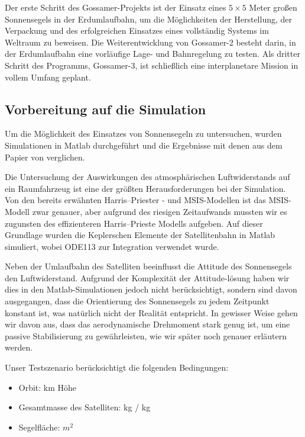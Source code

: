 Der erste Schritt des Gossamer-Projekts ist der Einsatz eines $5\times5$ Meter großen Sonnensegels in der Erdumlaufbahn, um die Möglichkeiten der Herstellung, der Verpackung und des erfolgreichen Einsatzes eines vollständig Systems im Weltraum zu beweisen. Die Weiterentwicklung von Gossamer-2 besteht darin, in der Erdumlaufbahn eine vorläufige Lage- und Bahnregelung zu testen. Als dritter Schritt des Programms, Gossamer-3, ist schließlich eine interplanetare Mission in vollem Umfang geplant. 

\subsection{Vorbereitung auf die Simulation}
Um die Möglichkeit des Einsatzes von Sonnensegeln zu untersuchen, wurden Simulationen in Matlab durchgeführt und die Ergebnisse mit denen aus dem Papier von \citet{Daniele:2012} verglichen. 

Die Untersuchung der Auswirkungen des atmosphärischen Luftwiderstands auf ein Raumfahrzeug ist eine der größten Herausforderungen bei der Simulation. Von den bereits erwähnten Harris–Priester - und MSIS-Modellen ist das MSIS-Modell zwar genauer, aber aufgrund des riesigen Zeitaufwands mussten wir es zugunsten des effizienteren Harris–Prieste Modells aufgeben. Auf dieser Grundlage wurden die Keplerschen Elemente der Satellitenbahn in Matlab simuliert, wobei ODE113 zur Integration verwendet wurde. 

Neben der Umlaufbahn des Satelliten beeinflusst die Attitude des Sonnensegels den Luftwiderstand. Aufgrund der Komplexität der Attitude-lösung haben wir dies in den Matlab-Simulationen jedoch nicht berücksichtigt, sondern sind davon ausgegangen, dass die Orientierung des Sonnensegels zu jedem Zeitpunkt konstant ist, was natürlich nicht der Realität entspricht. In gewisser Weise gehen wir davon aus, dass das aerodynamische Drehmoment stark genug ist, um eine passive Stabilisierung zu gewährleisten, wie wir später noch genauer erläutern werden. 

Unser Testszenario berücksichtigt die folgenden Bedingungen:
\begin{itemize}
	\item Orbit: \unit[600]{km} Höhe
	\item Gesamtmasse des Satelliten: \unit[2500]{kg} / \unit[500]{kg}
	\item Segelfläche: \unit[25]{$m^2$}
\end{itemize}
\clearpage
